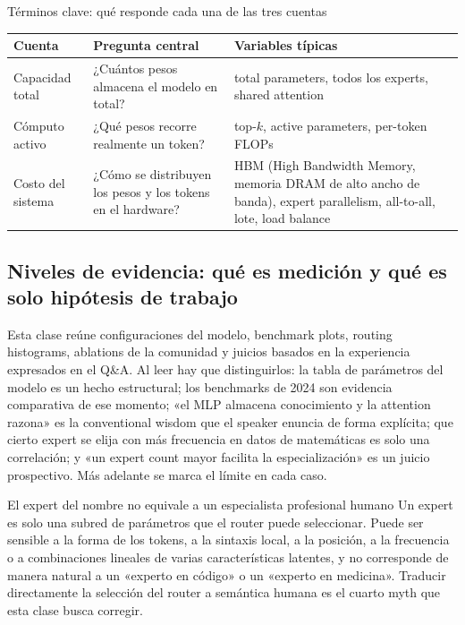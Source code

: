 \begin{knowledgebox}{Términos clave: qué responde cada una de las tres cuentas}
\begin{tabularx}{\textwidth}{L{0.18\textwidth} L{0.28\textwidth} X}
\toprule
Cuenta & Pregunta central & Variables típicas \\
\midrule
Capacidad total & ¿Cuántos pesos almacena el modelo en total? & total parameters, todos los experts, shared attention \\
Cómputo activo & ¿Qué pesos recorre realmente un token? & top-$k$, active parameters, per-token FLOPs \\
Costo del sistema & ¿Cómo se distribuyen los pesos y los tokens en el hardware? & HBM (High Bandwidth Memory, memoria DRAM de alto ancho de banda), expert parallelism, all-to-all, lote, load balance \\
\bottomrule
\end{tabularx}
\end{knowledgebox}


\subsection{Niveles de evidencia: qué es medición y qué es solo hipótesis de trabajo}

Esta clase reúne configuraciones del modelo, benchmark plots, routing histograms, ablations de la comunidad y juicios basados en la experiencia expresados en el Q\&A. Al leer hay que distinguirlos: la tabla de parámetros del modelo es un hecho estructural; los benchmarks de 2024 son evidencia comparativa de ese momento; «el MLP almacena conocimiento y la attention razona» es la conventional wisdom que el speaker enuncia de forma explícita; que cierto expert se elija con más frecuencia en datos de matemáticas es solo una correlación; y «un expert count mayor facilita la especialización» es un juicio prospectivo. Más adelante se marca el límite en cada caso.

\begin{warningbox}{El expert del nombre no equivale a un especialista profesional humano}
Un expert es solo una subred de parámetros que el router puede seleccionar. Puede ser sensible a la forma de los tokens, a la sintaxis local, a la posición, a la frecuencia o a combinaciones lineales de varias características latentes, y no corresponde de manera natural a un «experto en código» o un «experto en medicina». Traducir directamente la selección del router a semántica humana es el cuarto myth que esta clase busca corregir.
\end{warningbox}


